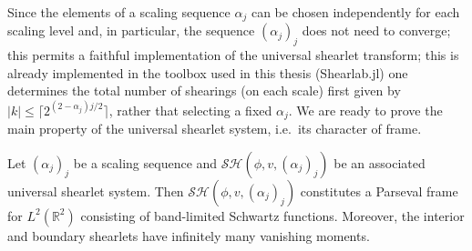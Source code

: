 \bigskip

Since the elements of a scaling sequence $\alpha_j$ can be chosen independently for each scaling level and, in particular, the sequence $(\alpha_j)_j$ does not need to converge; this permits a faithful implementation of the universal shearlet transform; this is already implemented in the toolbox used in this thesis (Shearlab.jl) one determines the total number of shearings (on each scale) first given by $|k|\leq \lceil 2^{(2-\alpha_j)j/2}\rceil$, rather that selecting a fixed $\alpha_j$. We are ready to prove the main property of the universal shearlet system, i.e.\ its character of frame.

\begin{thm}
\label{thm:alpha34}
Let $(\alpha_j)_{j}$ be a scaling sequence and $\mathcal{SH}(\phi,v,(\alpha_j)_j)$ be an associated universal shearlet system. Then $\mathcal{SH}(\phi,v,(\alpha_j)_j)$ constitutes a Parseval frame for $L^2(\mathbb{R}^2)$ consisting of band-limited Schwartz functions. Moreover, the interior and boundary shearlets have infinitely  many vanishing moments. 
\end{thm}
